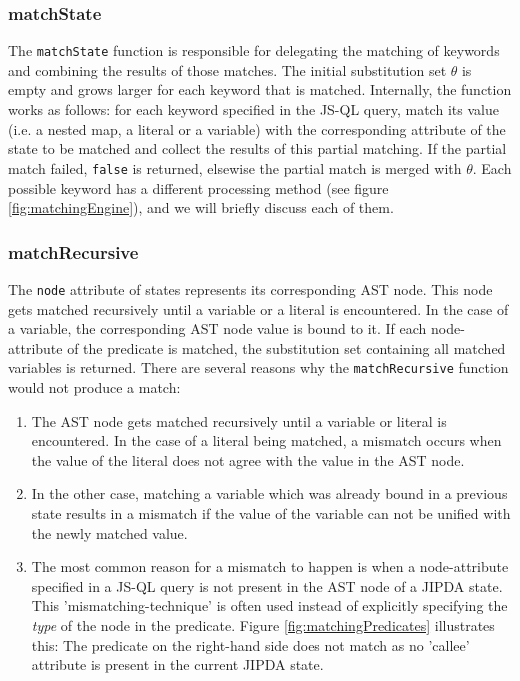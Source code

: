 \subsubsection{matchState}
The \texttt{matchState} function is responsible for delegating the matching of keywords and combining the results of those matches. The initial substitution set $\theta$ is empty and grows larger for each keyword that is matched. Internally, the function works as follows: for each keyword specified in the JS-QL query, match its value (i.e. a nested map, a literal or a variable) with the corresponding attribute of the state to be matched and collect the results of this partial matching. If the partial match failed, \texttt{false} is returned, elsewise the partial match is merged with $\theta$. Each possible keyword has a different processing method (see figure \ref{fig:matchingEngine}), and we will briefly discuss each of them.

\subsubsection{matchRecursive}
The \texttt{node} attribute of states represents its corresponding AST node. This node gets matched recursively until a variable or a literal is encountered. In the case of a variable, the corresponding AST node value is bound to it. If each node-attribute of the predicate is matched, the substitution set containing all matched variables is returned. There are several reasons why the \texttt{matchRecursive} function would not produce a match:
\begin{enumerate}
\item The AST node gets matched recursively until a variable or literal is encountered. In the case of a literal being matched, a mismatch occurs when the value of the literal does not agree with the value in the AST node.
\item In the other case, matching a variable which was already bound in a previous state results in a mismatch if the value of the variable can not be unified with the newly matched value.
\item The most common reason for a mismatch to happen is when a node-attribute specified in a JS-QL query is not present in the AST node of a JIPDA state. This 'mismatching-technique' is often used instead of explicitly specifying the \textit{type} of the node in the predicate. Figure \ref{fig:matchingPredicates} illustrates this: The predicate on the right-hand side does not match as no 'callee' attribute is present in the current JIPDA state.
\end{enumerate}

